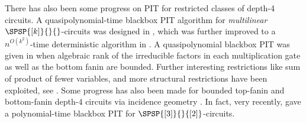 There has also been some progress on PIT for restricted classes of depth-4 circuits. A quasipolynomial-time blackbox PIT algorithm for \emph{multilinear} $\SPSP{[k]}{}{}$-circuits was designed in \cite{karnin2013deterministic}, which was further improved to a $n^{O(k^2)}$-time deterministic algorithm in \cite{saraf2018black}. A quasipolynomial blackbox PIT was given in \cite{beecken2013algebraic,DBLP:conf/coco/0001S16a} when algebraic rank of the irreducible factors in each multiplication gate as well as the bottom fanin are bounded. Further interesting restrictions like sum of product of fewer variables, and more structural restrictions have been exploited, see \cite{forbes2013quasipolynomial,agrawal2013quasi, forbes2015deterministic,mukhopadhyay2016depth,DBLP:journals/toc/0001S17}. Some progress has also been made for bounded top-fanin and bottom-fanin depth-$4$ circuits via incidence geometry \cite{gupta2014algebraic,shpilka2019sylvester,peleg2020generalized}. In fact, very recently, \cite{peleg2020polynomial} gave a polynomial-time blackbox PIT for $\SPSP{[3]}{}{[2]}$-circuits.

